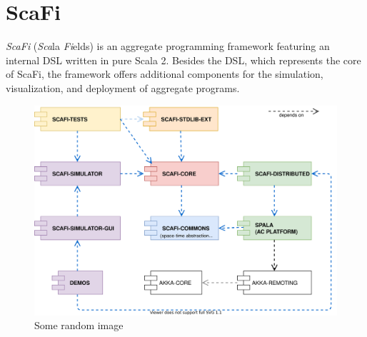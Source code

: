 \section{ScaFi}

\textit{ScaFi} (\textit{Sca}la \textit{Fi}elds) is an aggregate programming framework featuring an internal \ac{DSL} written in pure Scala 2.
%
Besides the \ac{DSL}, which represents the core of ScaFi, the framework offers additional components for the simulation, visualization, and deployment of aggregate programs.

\begin{figure}
    \centering
    \includegraphics[width=.8\linewidth]{figures/scafi-project-org.drawio.png}
    \caption{Some random image}
    \label{fig:random-image2}
\end{figure}

